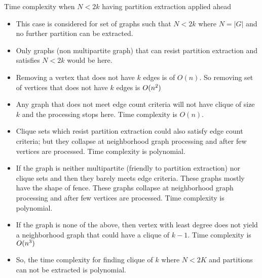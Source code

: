 \documentclass[landscape]{slides}
\begin{document}
\begin{slide}
	\begin{center}{\large Time complexity when $N < 2k$ having partition extraction applied ahead}\end{center}
	\small
	\begin{itemize}
		\setlength{\itemsep}{0pt}
		\setlength{\parskip}{20pt}
		\setlength{\parsep}{0pt}
		\item This case is considered for set of graphs such that $N < 2k$ where $N = |G|$ and no further partition can be extracted.
		\item Only graphs (non multipartite graph) that can resist partition extraction and satisfies $N < 2k$ would be here.
		\item Removing a vertex that does not have $k$ edges is of $O(n)$. So removing set of vertices that does not have $k$ edges is $O(n\textsuperscript{2})$
		\item Any graph that does not meet edge count criteria will not have clique of size $k$ and the processing stops here. Time complexity is $O(n)$.
		\item Clique sets which resist partition extraction could also satisfy edge count criteria; but they collapse at neighborhood graph processing and after few vertices are processed. Time complexity is polynomial.
		\item If the graph is neither multipartite (friendly to partition extraction) nor clique sets and then they barely meets edge criteria. These graphs mostly have the shape of fence. These graphs collapse at neighborhood graph processing and after few vertices are processed. Time complexity is polynomial.
		\item If the graph is none of the above, then vertex with least degree does not yield a neighborhood graph that could have a clique of $k - 1$. Time complexity is $O(n\textsuperscript{3})$
		\item So, the time complexity for finding clique of $k$ where $N < 2K$ and partitions can not be extracted is polynomial.
	\end{itemize}
\end{slide}
\end{document}
